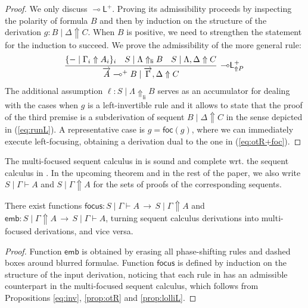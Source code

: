 \documentclass[runningheads]{llncs}
\renewcommand{\vec}{\overrightarrow}
\newcommand{\lleft}{{\multimap}\mathsf{L}}
\newcommand{\lolliL}{\lleft}
\newcommand{\lolli}{\multimap}
\renewcommand{\L}{\mathsf{L}}
\newcommand{\up}{\Uparrow}
\newcommand{\upl}{\Uparrow_{\mathsf{li}}}
\newcommand{\foc}{\mathsf{foc}}
\newcommand{\focus}{\mathsf{focus}}
\newcommand{\emb}{\mathsf{emb}}
\begin{document}
\begin{proof}
  We only discuss $\lolliL^+$. Proving its admissibility proceeds by inspecting the polarity of formula $B$ and then by induction on the structure of the derivation $g : B \mid \Delta \up C$. When $B$ is positive, we need to strengthen the statement for the induction to succeed. We prove the admissibility of the more general rule:
  \[
  \begin{array}{c}
    \infer[\lolliL^+_{\up P}]{\vec{A} \lolli^+ B \mid \vec{\Gamma} , \Delta \up C}{
      \{ - \mid \Gamma_i \up A_i \}_{i}
      &
      S\mid \Lambda \upl B
      &
      S \mid \Lambda,\Delta \up C
    }
  \end{array}
  \]
  The additional assumption $\ell:S\mid \Lambda \upl B$ serves as an accumulator for dealing with the cases when $g$ is a left-invertible rule
  and it allows to state that the proof of the third premise is a subderivation of sequent $B \mid \Delta \up C$ in the sense depicted in (\ref{eq:runL}). A representative case is $g = \foc(g)$, where we can immediately execute left-focusing, obtaining a derivation dual to the one in (\ref{eq:otR+foc}).
\end{proof}

The multi-focused sequent calculus in  is sound and complete wrt. the sequent calculus in . 
In the upcoming theorem and in the rest of the paper, we also write $S \mid \Gamma \vdash A$ and $S \mid \Gamma \up A$ for the sets of proofs of the corresponding sequents.
\begin{theorem}\label{thm}
  There exist functions $\focus : S \mid \Gamma \vdash A \, \to \, S \mid \Gamma \up A$  and $\emb: S \mid \Gamma \up A \, \to \, S \mid \Gamma \vdash A$, turning sequent calculus derivations into multi-focused derivations, and vice versa.
\end{theorem}
\begin{proof}
Function $\emb$ is obtained by erasing all phase-shifting rules and dashed boxes around blurred formulae. Function $\focus$ is defined by induction on the structure of the input derivation, noticing that each rule in  has an admissible counterpart in the multi-focused sequent calculus, which follows from Propositions \ref{eq:inv}, \ref{prop:otR} and \ref{prop:lolliL}.
\end{proof}
\end{document}

